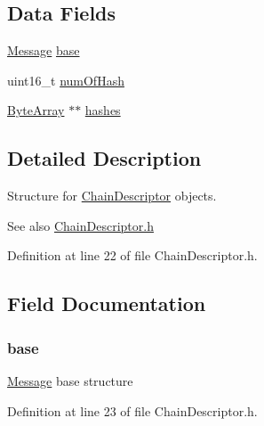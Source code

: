 \subsection*{Data Fields}
\begin{DoxyCompactItemize}
\item 
\hyperlink{struct_message}{Message} \hyperlink{struct_chain_descriptor_a8987f797adf70c3e174fd64cc68bc933}{base}
\item 
uint16\_\-t \hyperlink{struct_chain_descriptor_a2a73cb6d678dd0457074398eb7c27584}{numOfHash}
\item 
\hyperlink{struct_byte_array}{ByteArray} $\ast$$\ast$ \hyperlink{struct_chain_descriptor_accd2c3f99c875e8657d976fc264c7fc6}{hashes}
\end{DoxyCompactItemize}


\subsection{Detailed Description}
Structure for \hyperlink{struct_chain_descriptor}{ChainDescriptor} objects. 

\begin{DoxySeeAlso}{See also}
\hyperlink{_chain_descriptor_8h}{ChainDescriptor.h} 
\end{DoxySeeAlso}


Definition at line 22 of file ChainDescriptor.h.



\subsection{Field Documentation}
\hypertarget{struct_chain_descriptor_a8987f797adf70c3e174fd64cc68bc933}{
\subsubsection[{base}]{ {\bf base}}}
\label{struct_chain_descriptor_a8987f797adf70c3e174fd64cc68bc933}
\hyperlink{struct_message}{Message} base structure 

Definition at line 23 of file ChainDescriptor.h.

